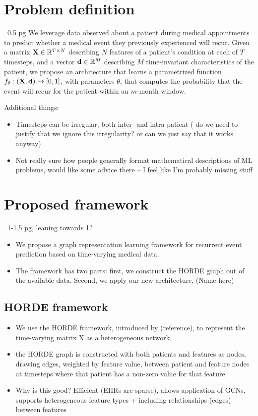 \documentclass[conference]{IEEEtran}
\begin{document}
\section{Problem definition}
~0.5 pg
We leverage data observed about a patient during medical appointments to predict whether a medical event they previously experienced will recur. 
Given a matrix $\bold{X} \in \mathbb{R}^{T \times N}$ describing $N$ features of a patient's condition at each of $T$ timesteps, 
    and a vector $\bold{d} \in \mathbb{R}^M$ describing $M$ time-invariant characteristics of the patient, 
    we propose an architecture that learns a parametrized function $f_\theta : (\bold{X}, \bold{d}) \rightarrow \left[0, 1\right]$, 
    with parameters $\theta$, that computes the probability that the event will recur for the patient within an $m$-month window. 

Additional things:
\begin{itemize}
    \item Timesteps can be irregular, both inter- and intra-patient ({\color{red} do we need to justify that we ignore this irregularity? or can we just say that it works anyway)}
    \item {\color{red}Not really sure how people generally format mathematical descriptions of ML problems, would like some advice there -- I feel like I'm probably missing stuff}
\end{itemize}

\section{Proposed framework}
~1-1.5 pg, leaning towards 1?
\begin{itemize}
    \item We propose a graph representation learning framework for recurrent event prediction based on time-varying medical data.
    \item The framework has two parts: first, we construct the HORDE graph out of the available data. Second, we apply our new architecture, (Name here)
\end{itemize}

\subsection{HORDE framework}
\begin{itemize}
    \item We use the HORDE framework, introduced by (reference), to represent the time-varying matrix X as a heterogeneous network.
    \item the HORDE graph is constructed with both patients and features as nodes, drawing edges, weighted by feature value, 
            between patient and feature nodes at timesteps where that patient has a non-zero value for that feature
    \item Why is this good? Efficient (EHRs are sparse), allows application of GCNs, supports heterogeneous feature types + including relationships (edges) between features
\end{itemize}
\end{document}
